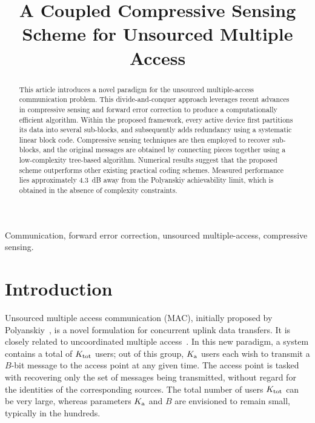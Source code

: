 \documentclass{article}
\title {A Coupled Compressive Sensing Scheme for Unsourced Multiple Access}
\begin{document}
\maketitle

\begin{abstract}
This article introduces a novel paradigm for the unsourced multiple-access communication problem.
This divide-and-conquer approach leverages recent advances in compressive sensing and forward error correction to produce a computationally efficient algorithm.
Within the proposed framework, every active device first partitions its data into several sub-blocks, and subsequently adds redundancy using a systematic linear block code.
Compressive sensing techniques are then employed to recover sub-blocks, and the original messages are obtained by connecting pieces together using a low-complexity tree-based algorithm.
Numerical results suggest that the proposed scheme outperforms other existing practical coding schemes.
Measured performance lies approximately $4.3$~dB away from the Polyanskiy achievability limit, which is obtained in the absence of complexity constraints.
\end{abstract}

\begin{keywords}
Communication, forward error correction, unsourced multiple-access, compressive sensing.
\end{keywords}

\section{Introduction}
\label{sec:intro}

Unsourced multiple access communication (MAC), initially proposed by Polyanskiy~\cite{polyanskiy2017perspective}, is a novel formulation for concurrent uplink data transfers.
It is closely related to uncoordinated multiple access~\cite{paolini2015coded,chen2017capacity}.
In this new paradigm, a system contains a total of $K_\mathrm{tot}$ users; out of this group, $K_\mathrm{a}$ users each wish to transmit a $B$-bit message to the access point at any given time.
The access point is tasked with recovering only the set of messages being transmitted, without regard for the identities of the corresponding sources.
The total number of users $K_\mathrm{tot}$ can be very large, whereas parameters $K_\mathrm{a}$ and $B$ are envisioned to remain small, typically in the hundreds.
\end{document}
